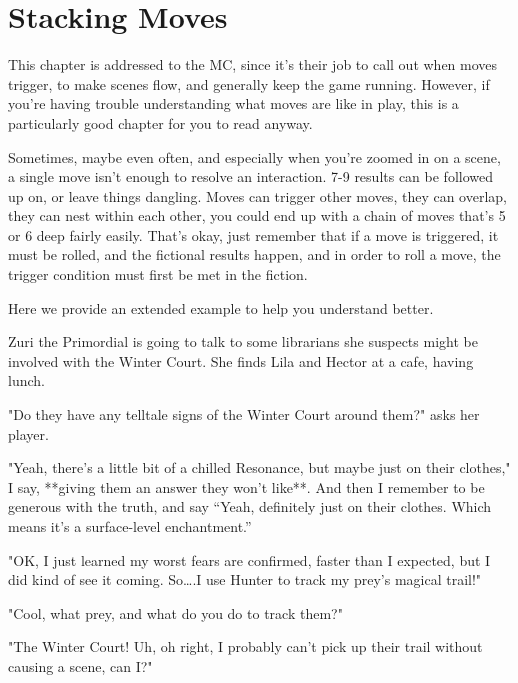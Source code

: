 \documentclass[
  oneside,
  statementpaper,
  9pt]{memoir}
\begin{document}
\hypertarget{stacking-moves}{%
\chapter{Stacking Moves}\label{stacking-moves}}

\begin{Player}

This chapter is addressed to the MC, since it's their job to call out when moves trigger, to make scenes flow, and generally keep the game running. However, if you're having trouble understanding what moves are like in play, this is a particularly good chapter for you to read anyway.

\end{Player}

\begin{MC}

Sometimes, maybe even often, and especially when you’re zoomed in on a scene, a single move isn’t enough to resolve an interaction. 7-9 results can be followed up on, or leave things dangling. Moves can trigger other moves, they can overlap, they can nest within each other, you could end up with a chain of moves that’s 5 or 6 deep fairly easily. That’s okay, just remember that if a move is triggered, it must be rolled, and the fictional results happen, and in order to roll a move, the trigger condition must first be met in the fiction.

Here we provide an extended example to help you understand better.

Zuri the Primordial is going to talk to some librarians she suspects might be involved with the Winter Court. She finds Lila and Hector at a cafe, having lunch.

"Do they have any telltale signs of the Winter Court around them?" asks her player.

"Yeah, there’s a little bit of a chilled Resonance, but maybe just on their clothes," I say, **giving them an answer they won’t like**. And then I remember to be generous with the truth, and say “Yeah, definitely just on their clothes. Which means it’s a surface-level enchantment.”

"OK, I just learned my worst fears are confirmed, faster than I expected, but I did kind of see it coming. So….I use Hunter to track my prey’s magical trail!"

"Cool, what prey, and what do you do to track them?"

"The Winter Court! Uh, oh right, I probably can’t pick up their trail without causing a scene, can I?"


\end{MC}
\end{document}
